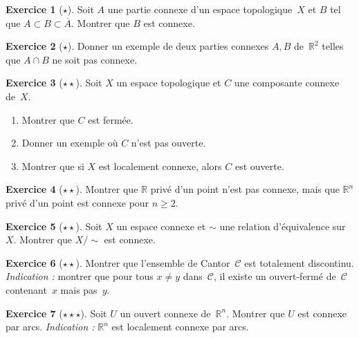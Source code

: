 \documentclass[12pt,a4paper,openany]{book}
\theoremstyle{definition}
\theoremstyle{cours}
\theoremstyle{coursnormal}
\newtheorem{exercice}{Exercice}[chapter]
\begin{document}
\begin{exercice}[$\star$]
\label{exo:connexe-fermeture}
Soit $A$ une partie connexe d'un espace topologique~$X$ et $B$ tel que
$A \subset B \subset \overline{A}$. Montrer que $B$ est connexe.
\end{exercice}

\begin{exercice}[$\star$]
\label{exo:connexe-intersection}
Donner un exemple de deux parties connexes $A, B$ de~$\mathbb{R}^2$ telles que
$A \cap B$ ne soit pas connexe.
\end{exercice}

\begin{exercice}[$\star\star$]
\label{exo:composante-connexe-fermee}
Soit $X$ un espace topologique et $C$ une composante connexe de~$X$.
\begin{enumerate}[label=(\alph*)]
  \item Montrer que $C$ est fermée.
  \item Donner un exemple où $C$ n'est pas ouverte.
  \item Montrer que si $X$ est localement connexe, alors $C$ est ouverte.
\end{enumerate}
\end{exercice}

\begin{exercice}[$\star\star$]
\label{exo:R-prive-point}
Montrer que $\mathbb{R}$ privé d'un point n'est pas connexe, mais que
$\mathbb{R}^n$ privé d'un point est connexe pour $n \geqslant 2$.
\end{exercice}

\begin{exercice}[$\star\star$]
\label{exo:connexe-quotient}
Soit $X$ un espace connexe et $\sim$ une relation d'équivalence sur~$X$.
Montrer que $X/{\sim}$ est connexe.
\end{exercice}

\begin{exercice}[$\star\star$]
\label{exo:cantor-totalement-discontinu}
Montrer que l'ensemble de Cantor~$\mathcal{C}$ est totalement discontinu.
\emph{Indication :} montrer que pour tous $x \neq y$ dans~$\mathcal{C}$, il existe
un ouvert-fermé de~$\mathcal{C}$ contenant~$x$ mais pas~$y$.
\end{exercice}

\begin{exercice}[$\star\star\star$]
\label{exo:connexe-par-arcs-ouvert}
Soit $U$ un ouvert connexe de~$\mathbb{R}^n$. Montrer que $U$ est connexe par arcs.
\emph{Indication :} $\mathbb{R}^n$ est localement connexe par arcs.
\end{exercice}
\end{document}

